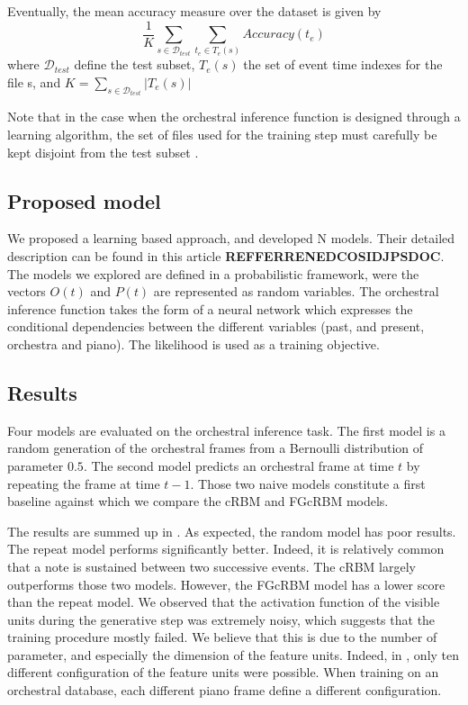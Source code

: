 \documentclass[twoside,twocolumn]{article}
\begin{document}
Eventually, the mean accuracy measure over the dataset is given by
\begin{equation}
\frac{1}{K} \sum_{s \in \mathcal{D}_{test}} \sum_{t_e \in T_e(s)} Accuracy(t_e)
\end{equation}
where $\mathcal{D}_{test}$ define the test subset, $T_{e}(s)$ the set of event time indexes for the file s, and $K = \sum_{s \in \mathcal{D}_{test}} |T_e(s)|$

Note that in the case when the orchestral inference function is designed through a learning algorithm, the set of files used for the training step must carefully be kept disjoint from the test subset \cite{bishop2006pattern}.

\subsection{Proposed model}
We proposed a learning based approach, and developed N models. Their detailed description can be found in this article \textbf{REFFERRENEDCOSIDJPSDOC}.
The models we explored are defined in a probabilistic framework, were the vectors $O(t)$ and $P(t)$ are represented as random variables. The orchestral inference function takes the form of a neural network which expresses the conditional dependencies between the different variables (past, and present, orchestra and piano). The likelihood is used as a training objective.

\subsection{Results}
Four models are evaluated on the orchestral inference task. The first model is a random generation of the orchestral frames from a Bernoulli distribution of parameter $0.5$. The second model predicts an orchestral frame at time $t$ by repeating the frame at time $t-1$. Those two naive models constitute a first baseline against which we compare the cRBM and FGcRBM models.

The results are summed up in . As expected, the random model has poor results. The repeat model performs significantly better. Indeed, it is relatively common that a note is sustained between two successive events. The cRBM largely outperforms those two models. However, the FGcRBM model has a lower score than the repeat model. We observed that the activation function of the visible units during the generative step was extremely noisy, which suggests that the training procedure mostly failed. We believe that this is due to the number of parameter,  and especially the dimension of the feature units. Indeed, in \cite{taylor2009factored}, only ten different configuration of the feature units were possible. When training on an orchestral database,  each different piano frame define a different configuration.
\end{document}
